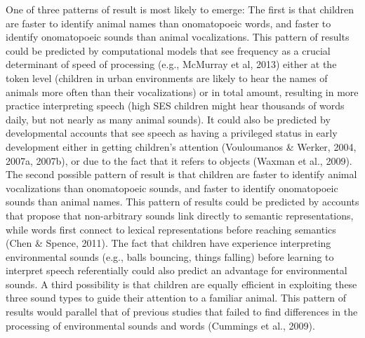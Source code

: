 \documentclass[english,floatsintext,man]{apa6}
\theoremstyle{definition}
\theoremstyle{definition}
\theoremstyle{definition}
\theoremstyle{remark}
\begin{document}
One of three patterns of result is most likely to emerge: The first is
that children are faster to identify animal names than onomatopoeic
words, and faster to identify onomatopoeic sounds than animal
vocalizations. This pattern of results could be predicted by
computational models that see frequency as a crucial determinant of
speed of processing (e.g., McMurray et al, 2013) either at the token
level (children in urban environments are likely to hear the names of
animals more often than their vocalizations) or in total amount,
resulting in more practice interpreting speech (high SES children might
hear thousands of words daily, but not nearly as many animal sounds). It
could also be predicted by developmental accounts that see speech as
having a privileged status in early development either in getting
children's attention (Vouloumanos \& Werker, 2004, 2007a, 2007b), or due
to the fact that it refers to objects (Waxman et al., 2009). The second
possible pattern of result is that children are faster to identify
animal vocalizations than onomatopoeic sounds, and faster to identify
onomatopoeic sounds than animal names. This pattern of results could be
predicted by accounts that propose that non-arbitrary sounds link
directly to semantic representations, while words first connect to
lexical representations before reaching semantics (Chen \& Spence,
2011). The fact that children have experience interpreting environmental
sounds (e.g., balls bouncing, things falling) before learning to
interpret speech referentially could also predict an advantage for
environmental sounds. A third possibility is that children are equally
efficient in exploiting these three sound types to guide their attention
to a familiar animal. This pattern of results would parallel that of
previous studies that failed to find differences in the processing of
environmental sounds and words (Cummings et al., 2009).
\end{document}

